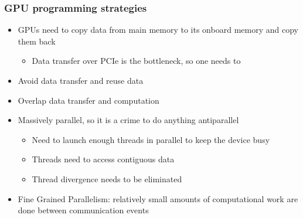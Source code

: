 \documentclass[10pt,t]{beamer}
\begin{document}
\begin{frame}
  \frametitle{GPU programming strategies}
  \begin{itemize}
  \item GPUs need to copy data from main memory to its onboard
    memory and copy them back
    \begin{itemize}
    \item Data transfer over PCIe is the bottleneck, so one needs to
    \end{itemize}
  \item Avoid data transfer and reuse data
  \item Overlap data transfer and computation
  \item Massively parallel, so it is a crime to do anything antiparallel
    \begin{itemize}
    \item Need to launch enough threads in parallel to keep the
      device busy
    \item Threads need to access contiguous data
    \item Thread divergence needs to be eliminated
    \end{itemize}
  \item Fine Grained Parallelism: relatively small amounts of computational work are done between communication events
  \end{itemize}
\end{frame}
\end{document}
